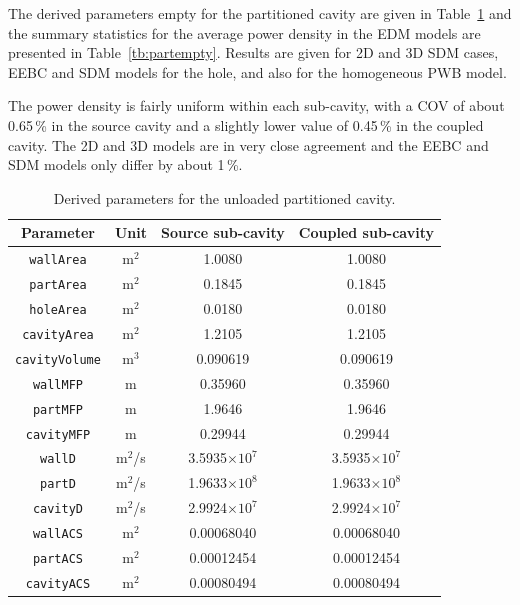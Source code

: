 \documentclass[a4paper]{article}
\numberwithin{equation}{section}
\newcounter{Table}
\begin{document}
The derived parameters empty for the partitioned cavity are given in Table~\ref{tb:derivparamdu} and the summary 
statistics for the average power density in the EDM models are presented in Table~\ref{tb:partempty}. 
Results are given for 2D and 3D SDM cases, EEBC and SDM models for the hole, and also for the homogeneous 
PWB model. 

The power density is fairly uniform within each sub-cavity, with a COV of about 0.65\,\% in the source cavity
and a slightly lower value of 0.45\,\% in the coupled cavity. The 2D and 3D models are in very close agreement
and the EEBC and SDM models only differ by about 1\,\%.

\begin{table}[ht]
\begin{center}
\begin{tabular}{|c|c|c|c|}
\hline
\textbf{Parameter}     &\textbf{Unit} &\textbf{Source sub-cavity} &\textbf{Coupled sub-cavity}\\ 
\hline
\texttt{wallArea}      &m$^2$         &1.0080                     &1.0080              \\
\texttt{partArea}      &m$^2$         &0.1845                     &0.1845              \\
\texttt{holeArea}      &m$^2$         &0.0180                     &0.0180              \\
\texttt{cavityArea}    &m$^2$         &1.2105                     &1.2105              \\
\texttt{cavityVolume}  &m$^3$         &0.090619                   &0.090619            \\
\texttt{wallMFP}       &m             &0.35960                    &0.35960             \\
\texttt{partMFP}       &m             &1.9646                     &1.9646              \\
\texttt{cavityMFP}     &m             &0.29944                    &0.29944             \\
\texttt{wallD}         &m$^2$/s       &3.5935$\times 10^7$        &3.5935$\times 10^7$ \\
\texttt{partD}         &m$^2$/s       &1.9633$\times 10^8$        &1.9633$\times 10^8$ \\
\texttt{cavityD}       &m$^2$/s       &2.9924$\times 10^7$        &2.9924$\times 10^7$ \\
\texttt{wallACS}       &m$^2$         &0.00068040                 &0.00068040          \\
\texttt{partACS}       &m$^2$         &0.00012454                 &0.00012454          \\
\texttt{cavityACS}     &m$^2$         &0.00080494                 &0.00080494          \\
\hline
\end{tabular}
\end{center}
\caption{\label{tb:derivparamdu} Derived parameters for the unloaded partitioned cavity.}
\end{table}
\end{document}
